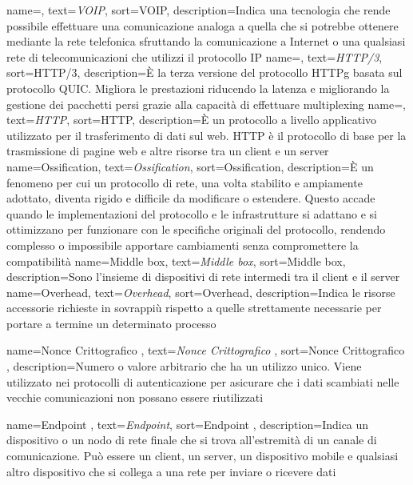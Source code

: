  {
    name=,
    text=\emph{VOIP},
    sort=VOIP,
    description={Indica una tecnologia che rende possibile effettuare una comunicazione analoga a quella che si potrebbe ottenere mediante la rete telefonica sfruttando la 
    comunicazione a Internet o una qualsiasi rete di telecomunicazioni che utilizzi il protocollo IP} 
}
 {
    name=,
    text=\emph{HTTP/3},
    sort=HTTP/3,
    description={È la terza versione del protocollo \gls{HTTPg} basata sul protocollo \gls{QUIC}. Migliora le prestazioni riducendo la latenza e migliorando la gestione dei pacchetti persi grazie alla capacità di effettuare \gls{multiplexing}}
}
 {
    name=,
    text=\emph{HTTP},
    sort=HTTP,
    description={È un protocollo a livello applicativo utilizzato per il trasferimento di dati sul web. HTTP è il protocollo di base per la trasmissione di pagine web e altre risorse tra un \gls{client} e un \gls{server}}
}
 {
    name=Ossification,
    text=\emph{Ossification},
    sort=Ossification,
    description={È un fenomeno per cui un protocollo di rete, una volta stabilito e ampiamente adottato, diventa rigido e difficile da modificare o estendere. Questo accade quando le implementazioni del protocollo e le infrastrutture si adattano e si ottimizzano per funzionare con le specifiche originali del protocollo, rendendo complesso o impossibile apportare cambiamenti senza compromettere la compatibilità}
}
 {
    name=Middle box,
    text=\emph{Middle box},
    sort=Middle box,
    description={Sono l'insieme di dispositivi di rete intermedi tra il \gls{client} e il \gls{server}}
}
 {
    name=Overhead,
    text=\emph{Overhead},
    sort=Overhead,
    description={Indica le risorse accessorie richieste in sovrappiù rispetto a quelle strettamente necessarie per portare a termine un determinato processo}
}

 {
    name=Nonce Crittografico ,
    text=\emph{Nonce Crittografico },
    sort=Nonce Crittografico ,
    description={Numero o valore arbitrario che ha un utilizzo unico. Viene utilizzato nei protocolli di autenticazione per asicurare che i dati scambiati nelle vecchie comunicazioni non possano essere riutilizzati}
}

 {
    name=Endpoint ,
    text=\emph{Endpoint},
    sort=Endpoint ,
    description={Indica un dispositivo o un nodo di rete finale che si trova all'estremità di un canale di comunicazione. Può essere un \gls{client}, un \gls{server}, un dispositivo mobile e qualsiasi altro dispositivo che si collega a una rete per inviare o ricevere dati}
}

